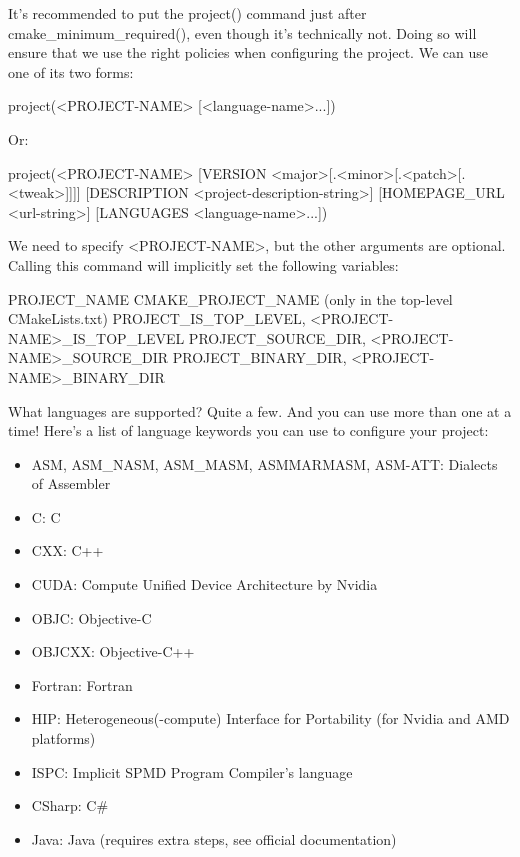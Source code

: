 
It’s recommended to put the project() command just after cmake\_minimum\_required(), even though it’s technically not. Doing so will ensure that we use the right policies when configuring the project. We can use one of its two forms:

\begin{shell}
project(<PROJECT-NAME> [<language-name>...])
\end{shell}

Or:

\begin{shell}
project(<PROJECT-NAME>
        [VERSION <major>[.<minor>[.<patch>[.<tweak>]]]]
        [DESCRIPTION <project-description-string>]
        [HOMEPAGE_URL <url-string>]
        [LANGUAGES <language-name>...])
\end{shell}

We need to specify <PROJECT-NAME>, but the other arguments are optional. Calling this command will implicitly set the following variables:

\begin{shell}
PROJECT_NAME
CMAKE_PROJECT_NAME (only in the top-level CMakeLists.txt)
PROJECT_IS_TOP_LEVEL, <PROJECT-NAME>_IS_TOP_LEVEL
PROJECT_SOURCE_DIR, <PROJECT-NAME>_SOURCE_DIR
PROJECT_BINARY_DIR, <PROJECT-NAME>_BINARY_DIR
\end{shell}

What languages are supported? Quite a few. And you can use more than one at a time! Here’s a list of language keywords you can use to configure your project:

\begin{itemize}
\item
ASM, ASM\_NASM, ASM\_MASM, ASMMARMASM, ASM-ATT: Dialects of Assembler

\item
C: C

\item
CXX: C++

\item
CUDA: Compute Unified Device Architecture by Nvidia

\item
OBJC: Objective-C

\item
OBJCXX: Objective-C++

\item
Fortran: Fortran

\item
HIP: Heterogeneous(-compute) Interface for Portability (for Nvidia and AMD platforms)

\item
ISPC: Implicit SPMD Program Compiler’s language

\item
CSharp: C\#

\item
Java: Java (requires extra steps, see official documentation)
\end{itemize}

